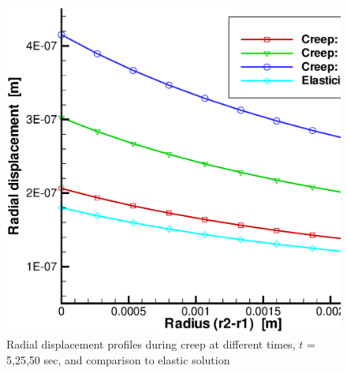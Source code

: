 \begin{figure}[H]
\centering
\includegraphics[scale=0.4]{M/crp/ex2_ur}
\vspace{-3mm}
\caption{Radial displacement profiles during creep at different times, $t$ = 5,25,50 sec,
and comparison to elastic solution}
\label{fig:ex2_ur}
\end{figure}
